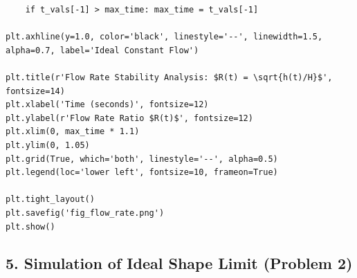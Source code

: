 \documentclass[a4paper, 12pt]{article}
\begin{document}
\begin{lstlisting}
    if t_vals[-1] > max_time: max_time = t_vals[-1]

plt.axhline(y=1.0, color='black', linestyle='--', linewidth=1.5, alpha=0.7, label='Ideal Constant Flow')

plt.title(r'Flow Rate Stability Analysis: $R(t) = \sqrt{h(t)/H}$', fontsize=14)
plt.xlabel('Time (seconds)', fontsize=12)
plt.ylabel(r'Flow Rate Ratio $R(t)$', fontsize=12)
plt.xlim(0, max_time * 1.1)
plt.ylim(0, 1.05)
plt.grid(True, which='both', linestyle='--', alpha=0.5)
plt.legend(loc='lower left', fontsize=10, frameon=True)

plt.tight_layout()
plt.savefig('fig_flow_rate.png') 
plt.show()
\end{lstlisting}

\subsection*{5. Simulation of Ideal Shape Limit (Problem 2)}
\end{document}
